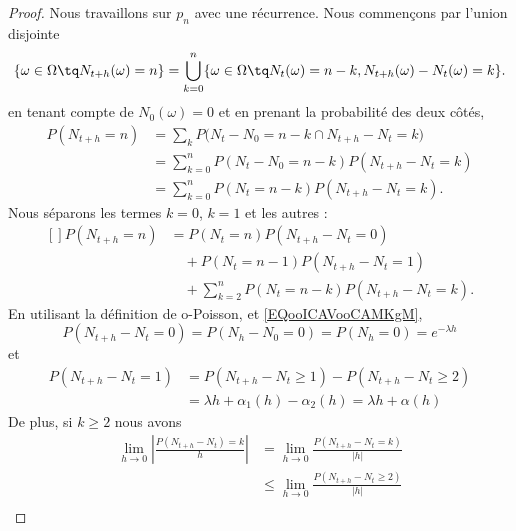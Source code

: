 \begin{proof}
	Nous travaillons sur \( p_n\) avec une récurrence. Nous commençons par l'union disjointe
	\begin{equation}
		\{ \omega\in \Omega\tq N_{t+h}(\omega)=n \}=\bigcup_{k=0}^n\{ \omega\in \Omega\tq N_t(\omega)=n-k,N_{t+h}(\omega)-N_t(\omega)=k \}.
	\end{equation}
	en tenant compte de \( N_0(\omega)=0\) et en prenant la probabilité des deux côtés,
	\begin{subequations}
		\begin{align}
			P(N_{t+h}=n) & =\sum_kP\big( N_t-N_0=n-k \cap N_{t+h}-N_t=k \big) \\
			             & =\sum_{k=0}^nP(N_t-N_0=n-k)P(N_{t+h}-N_t=k)        \\
			             & =\sum_{k=0}^nP(N_t=n-k)P(N_{t+h}-N_t=k).
		\end{align}
	\end{subequations}
	Nous séparons les termes \( k=0\), \( k=1\) et les autres :
	\begin{equation}		\label{EQooDZNTooHOQAjX}
		\begin{aligned}[]
			P(N_{t+h}=n) & =P(N_t=n)P(N_{t+h}-N_t=0)                      \\
			             & \quad +P(N_t=n-1)P(N_{t+h}-N_t=1)              \\
			             & \quad +\sum_{k=2}^nP(N_t=n-k)P(N_{t+h}-N_t=k).
		\end{aligned}
	\end{equation}
	En utilisant la définition de o-Poisson, et \eqref{EQooICAVooCAMKgM},
	\begin{equation}		\label{EQooZFSYooCUPQBS}
		P(N_{t+h}-N_t=0)=P(N_h-N_0=0)=P(N_h=0)=e^{-\lambda h}
	\end{equation}
	et
	\begin{subequations}		\label{EQooQFMGooRkdytQ}
		\begin{align}
			P(N_{t+h}-N_t=1) & =P(N_{t+h}-N_t\geq 1)-P(N_{t+h}-N_t\geq 2)             \\
			                 & =\lambda h+\alpha_1(h)-\alpha_2(h)=\lambda h+\alpha(h)
		\end{align}
	\end{subequations}
	De plus, si \( k\geq 2\) nous avons
	\begin{subequations}
		\begin{align}
			\lim_{h\to 0}\left| \frac{ P(N_{t+h}-N_t)=k }{ h } \right| & = \lim_{h\to 0}\frac{ P(N_{t+h}-N_t=k) }{ | h | }       \\
			                                                           & \leq\lim_{h\to 0}\frac{ P(N_{t+h}-N_t\geq 2) }{ | h | } \\

\end{align}
\end{subequations}
\end{proof}
